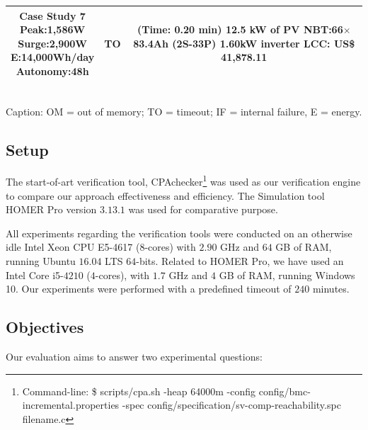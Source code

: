 \documentclass[journal]{IEEEtran}
\begin{document}
\begin{table}[!t]
\begin{scriptsize}
\begin{tabular}{|c|c|c|}
\hline
\makecell{\textbf{Case Study 7}\\Peak:1,586W\\Surge:2,900W\\E:14,000Wh/day\\Autonomy:48h} & TO & \makecell{(Time: 0.20 min)\\12.5 kW of PV\\NBT:66$\times$83.4Ah (2S-33P)\\1.60kW inverter\\LCC: US\$ 41,878.11} \\
\hline
\hline
\end{tabular}
\\Caption: OM = out of memory; TO = timeout; IF = internal failure, E = energy.
\end{scriptsize}
\end{table}

\subsection{Setup} 

The start-of-art verification tool, CPAchecker\footnote{Command-line: \$ scripts/cpa.sh -heap 64000m -config config/bmc-incremental.properties -spec config/specification/sv-comp-reachability.spc filename.c} was used as our verification engine to compare our approach effectiveness and efficiency. The Simulation tool HOMER Pro version $3.13.1$ was used for comparative purpose.

All experiments regarding the verification tools were conducted 
on an otherwise idle Intel Xeon CPU E5-4617 ($8$-cores) with 
$2.90$ GHz and $64$ GB of RAM, running Ubuntu $16.04$ LTS $64$-bits. 
Related to HOMER Pro, we have used an Intel Core i5-$4210$ ($4$-cores), 
with $1.7$ GHz and $4$ GB of RAM, running Windows 10. 
Our experiments were performed with a predefined timeout of $240$ minutes.

\subsection{Objectives} 

Our evaluation aims to answer two experimental questions: 
\end{document}
